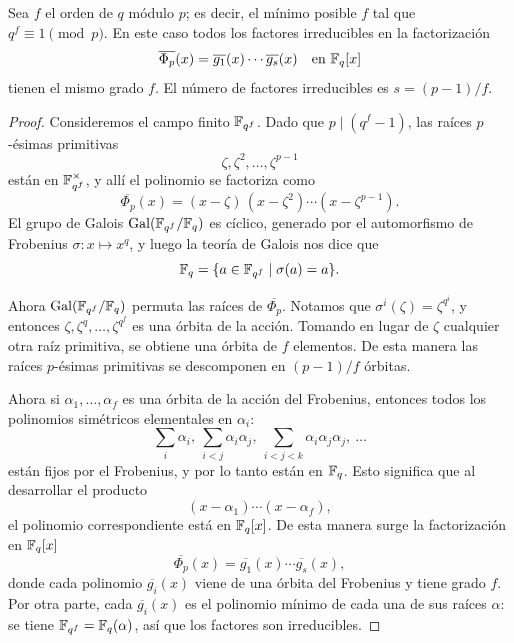 \begin{lema}
  \label{lema:factorizacion-de-Phi-p-mod-q}
  Sea $f$ el orden de $q$ módulo $p$; es decir, el mínimo posible $f$
  tal que $q^f \equiv 1 \pmod{p}$. En este caso todos los factores irreducibles
  en la factorización
  \[ \overline{\Phi_p} (x) = \overline{g_1} (x) \cdots \overline{g_s} (x)
     \quad\text{en }\mathbb{F}_q [x] \]
  tienen el mismo grado $f$. El número de factores irreducibles es
  $s = (p-1)/f$.

  \begin{proof}
    Consideremos el campo finito $\mathbb{F}_{q^f}$. Dado que $p \mid (q^f - 1)$,
    las raíces $p$-ésimas primitivas
    $$\zeta, \zeta^2, \ldots, \zeta^{p-1}$$
    están en $\mathbb{F}_{q^f}^\times$, y allí el polinomio se factoriza como
    \[ \overline{\Phi_p} (x) =
       (x - \zeta)\,(x - \zeta^2)\cdots (x - \zeta^{p-1}). \]
    El grupo de Galois $\operatorname{Gal} (\mathbb{F}_{q^f}/\mathbb{F}_q)$ es cíclico, generado por
    el automorfismo de Frobenius $\sigma\colon x \mapsto x^q$, y luego la teoría
    de Galois nos dice que
    $$\mathbb{F}_q = \{ a \in \mathbb{F}_{q^f} \mid \sigma (a) = a \}.$$

    Ahora $\operatorname{Gal} (\mathbb{F}_{q^f}/\mathbb{F}_q)$ permuta las raíces de $\overline{\Phi_p}$.
    Notamos que $\sigma^i (\zeta) = \zeta^{q^i}$, y entonces
    $\zeta, \zeta^q, \ldots, \zeta^{q^f}$ es una órbita de la acción. Tomando en
    lugar de $\zeta$ cualquier otra raíz primitiva, se obtiene una órbita
    de $f$ elementos. De esta manera las raíces $p$-ésimas primitivas se
    descomponen en $(p-1)/f$ órbitas.

    Ahora si $\alpha_1,\ldots,\alpha_f$ es una órbita de la acción del
    Frobenius, entonces todos los polinomios simétricos elementales
    en $\alpha_i$:
    \[ \sum_i \alpha_i, ~
       \sum_{i < j} \alpha_i \alpha_j, ~
       \sum_{i < j < k} \alpha_i \alpha_j \alpha_j, ~
       \ldots \]
    están fijos por el Frobenius, y por lo tanto están en $\mathbb{F}_q$.
    Esto significa que al desarrollar el producto
    $$(x - \alpha_1)\cdots (x - \alpha_f),$$
    el polinomio correspondiente está en $\mathbb{F}_q [x]$. De esta manera surge
    la factorización en $\mathbb{F}_q [x]$
    $$\overline{\Phi_p} (x) = \overline{g_1} (x) \cdots \overline{g_s} (x),$$
    donde cada polinomio $\overline{g_i} (x)$ viene de una órbita del Frobenius
    y tiene grado $f$.
    Por otra parte, cada $\overline{g_i} (x)$ es el polinomio mínimo de cada una
    de sus raíces $\alpha$: se tiene $\mathbb{F}_{q^f} = \mathbb{F}_q (\alpha)$, así que los
    factores son irreducibles.
  \end{proof}
\end{lema}


